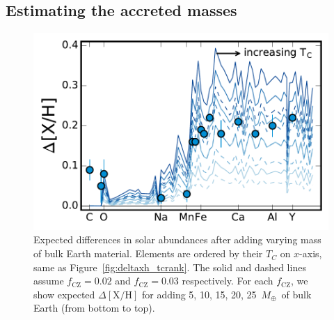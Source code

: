 \documentclass[12pt,letterpaper,margin=1in]{article}
\newcommand*\elem[1]{\ensuremath{\mathrm{#1}}}
\newcommand*\elemH[1]{\ensuremath{[\mathrm{#1}/\elem{H}]}}
\newcommand{\mearth}{\ensuremath{M_\oplus}}
\begin{document}
\subsection{Estimating the accreted masses}

\begin{figure}[htpb]
  \centering
  \includegraphics[width=0.95\linewidth]{deltaxh_tcrank_vari.pdf}
  \caption{Expected differences in solar abundances after adding
    varying mass of bulk Earth material.
    Elements are ordered by their $T_C$ on $x$-axis, same as
    Figure~\ref{fig:deltaxh_tcrank}.
    The solid and dashed lines assume $f_\mathrm{CZ}=0.02$ and $f_\mathrm{CZ} =
    0.03$ respectively.
    For each $f_\mathrm{CZ}$, we show expected $\Delta\elemH{X}$
    for adding 5, 10, 15, 20, 25~\mearth\ of bulk Earth (from bottom to top).
  }
  \label{fig:vari}
\end{figure}
\end{document}
